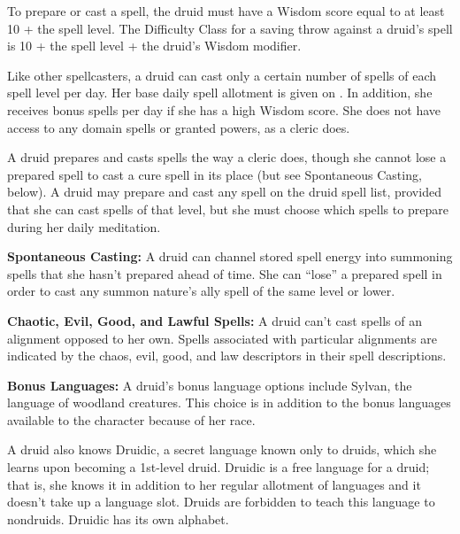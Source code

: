 To prepare or cast a spell, the druid must have a Wisdom score equal to at least 10 + the spell level. The Difficulty Class for a saving throw against a druid's spell is 10 + the spell level + the druid's Wisdom modifier.

Like other spellcasters, a druid can cast only a certain number of spells of each spell level per day. Her base daily spell allotment is given on . In addition, she receives bonus spells per day if she has a high Wisdom score. She does not have access to any domain spells or granted powers, as a cleric does.

A druid prepares and casts spells the way a cleric does, though she cannot lose a prepared spell to cast a cure spell in its place (but see Spontaneous Casting, below). A druid may prepare and cast any spell on the druid spell list, provided that she can cast spells of  that level, but she must choose which spells to prepare during her daily meditation.

\textbf{Spontaneous Casting:} A druid can channel stored spell energy into summoning spells that she hasn't prepared ahead of time. She can ``lose'' a prepared spell in order to cast any summon nature's ally spell of the same level or lower.

\textbf{Chaotic, Evil, Good, and Lawful Spells:} A druid can't cast spells of an alignment opposed to her own. Spells associated with particular alignments are indicated by the chaos, evil, good, and law descriptors in their spell descriptions.

\textbf{Bonus Languages:} A druid's bonus language options include Sylvan, the language of woodland creatures. This choice is in addition to the bonus languages available to the character because of her race.

A druid also knows Druidic, a secret language known only to druids, which she learns upon becoming a 1st-level druid. Druidic is a free language for a druid; that is, she knows it in addition to her regular allotment of languages and it doesn't take up a language slot. Druids are forbidden to teach this language to nondruids. Druidic has its own alphabet.


